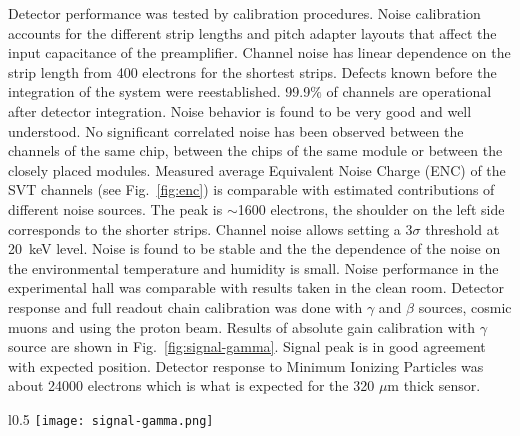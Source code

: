 Detector performance was tested by calibration procedures. Noise calibration accounts for the different strip lengths and pitch adapter layouts that affect the input capacitance of the preamplifier. Channel noise has linear dependence on the strip length from 400 electrons for the shortest strips. Defects known before the integration of the system were reestablished. 99.9$\%$ of channels are operational after detector integration. Noise behavior is found to be very good and well understood. No significant correlated noise has been observed between the channels of the same chip, between the chips of the same module or between the closely placed modules. Measured average Equivalent Noise Charge (ENC) of the SVT channels (see Fig.~\ref{fig:enc}) is comparable with estimated contributions of different noise sources. The peak is $\sim$1600 electrons, the shoulder on the left side corresponds to the shorter strips. Channel noise allows setting a 3$\sigma$ threshold at 20~keV level. Noise is found to be stable and the the dependence of the noise on the environmental temperature and humidity is small. Noise performance in the experimental hall was comparable with results taken in the clean room. Detector response and full readout chain calibration was done with $\gamma$ and $\beta$ sources, cosmic muons and using the proton beam. Results of absolute gain calibration with $\gamma$ source are shown in Fig.~\ref{fig:signal-gamma}. Signal peak is in good agreement with expected position. Detector response to Minimum Ionizing Particles was about 24000 electrons which is what is expected for the 320 $\mu$m thick sensor.
%
%

\begin{wrapfigure}{l}{0.5\columnwidth}
\texttt{[image: signal-gamma.png]}
\caption{Signal from Am$^{241}$ $\gamma$ source.}
\label{fig:signal-gamma}
\end{wrapfigure}

%

